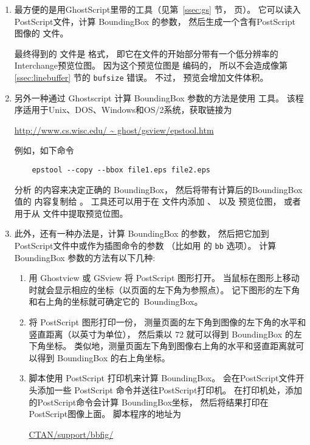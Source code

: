 \begin{enumerate}
	\item 最方便的是用GhostScript里带的工具（见第~\ref{ssec:gs} 节，\pageref{ssec:gs} 页）。
	它可以读入PostScript文件，计算 BoundingBox 的参数，
	然后生成一个含有PostScript 图像的 文件。
	
	最终得到的  文件是  格式，
	即它在文件的开始部分带有一个低分辨率的Interchange预览位图。
	因为这个预览位图是 \ascii 编码的，
	所以不会造成像第 \ref{ssec:linebuffer} 节的 \texttt{bufsize} 错误。
	不过， 预览会增加文件体积。
	\item 另外一种通过 Ghostscript 计算 BoundingBox 参数的方法是使用  工具。
	该程序适用于Unix、DOS、Windows和OS/2系统，获取链接为
	\begin{center}
		\url{http://www.cs.wisc.edu/ ~ ghost/gsview/epstool.htm}
	\end{center}
	例如，如下命令
\begin{verbatim}
    epstool --copy --bbox file1.eps file2.eps
\end{verbatim}
	分析  的内容来决定正确的 BoundingBox，
	然后将带有计算后的BoundingBox值的  内容复制给 。
	 工具还可以用于在  文件内添加 、 以及  预览位图，
	或者用于从  文件中提取预览位图。
	
	\item 此外，还有一种办法是，计算 BoundingBox 的参数，
	然后把它加到PostScript文件中或作为插图命令的参数
	（比如用  的 \texttt{bb} 选项）。
	计算BoundingBox 参数的方法有以下几种:	
	\begin{enumerate}
		\item 用 Ghostview 或 GSview 将 PostScript 图形打开。
		当鼠标在图形上移动时就会显示相应的坐标（以页面的左下角为参照点）。
		记下图形的左下角和右上角的坐标就可确定它的~BoundingBox。
		\item 将 PostScript 图形打印一份，
		测量页面的左下角到图像的左下角的水平和竖直距离（以英寸为单位），
		然后乘以 $72$ 就可以得到 BoundingBox 的左下角坐标。
		类似地，测量页面左下角到图像右上角的水平和竖直距离就可以得到 BoundingBox 的右上角坐标。
		\item {} 脚本使用 PostScript 打印机来计算 BoundingBox。
		 会在PostScript文件开头添加一些 PostScript 命令并送往PostScript打印机。
		在打印机处，添加的PostScript命令会计算 BoundingBox坐标，
		然后将结果打印在PostScript图像上面。
		 脚本程序的地址为
		\begin{center}
			\href{ftp://ctan.tug.org/tex-archive/support/bbfig/}{CTAN/support/bbfig/}
		\end{center}		
	\end{enumerate}
\end{enumerate}

